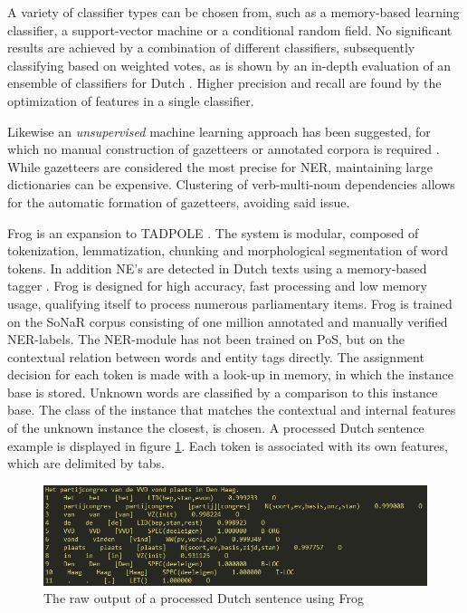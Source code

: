 A variety of classifier types can be chosen from, such as a memory-based learning classifier, a support-vector machine or a conditional random field.
No significant results are achieved by a combination of different classifiers, subsequently classifying based on weighted votes, as is shown by an in-depth evaluation of an ensemble of classifiers for Dutch  \cite{desmet2014fine}. Higher precision and recall are found by the optimization of features in a single classifier.

Likewise an \emph{unsupervised} machine learning approach has been suggested, for which no manual construction of gazetteers or annotated corpora is required \cite{kazama2008inducing}. While gazetteers are considered the most precise for NER, maintaining large dictionaries can be expensive. Clustering of verb-multi-noun dependencies allows for the automatic formation of gazetteers, avoiding said issue.

Frog is an expansion to TADPOLE \cite{bosch2007efficient}. The system is modular, composed of tokenization, lemmatization, chunking and morphological segmentation of word tokens. In addition NE's are detected in Dutch texts using a memory-based tagger \cite{daelemans2010mbt}. Frog is designed for high accuracy, fast processing and low memory usage, qualifying itself to process numerous parliamentary items. Frog is trained on the SoNaR corpus consisting of one million annotated and manually verified NER-labels. The NER-module has not been trained on PoS, but on the contextual relation between words and entity tags directly.  The assignment decision for each token is made with a look-up in memory, in which the instance base is stored. Unknown words are classified by a comparison to this instance base. The class of the instance that matches the contextual and internal features of the unknown instance the closest, is chosen. A processed Dutch sentence example is displayed in figure \ref{fig:frog_out}. Each token is associated with its own features, which are delimited by tabs.

\begin{figure}
    \centering
    \includegraphics[scale=0.7]{fig/frog_output}
    \caption{The raw output of a processed Dutch sentence using Frog}
    \label{fig:frog_out}
\end{figure}





